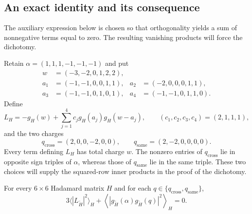 \subsection{An exact identity and its consequence}

The auxiliary expression below is chosen so that orthogonality yields a
sum of nonnegative terms equal to zero. The resulting vanishing products
will force the dichotomy.

Retain $\alpha=(1,1,1,-1,-1,-1)$ and put
\begin{align*}
  w&=(-3,-2,0,1,2,2),\\
  a_1&=(-1,-1,0,0,1,1),&
  a_2&=(-2,0,0,0,1,1),\\
  a_3&=(-1,-1,0,1,0,1),&
  a_4&=(-1,-1,0,1,1,0).
\end{align*}
Define
\begin{equation}
  L_H=-g_H(w)+\sum_{j=1}^4 c_j g_H(a_j)g_H(w-a_j),
  \qquad (c_1,c_2,c_3,c_4)=(2,1,1,1),
  \label{eq:pair-L}
\end{equation}
and the two charges
\begin{equation*}
  q_{\mathrm{cross}}=(2,0,0,-2,0,0),
  \qquad q_{\mathrm{same}}=(2,-2,0,0,0,0).
\end{equation*}
Every term defining $L_H$ has total charge $w$.
The nonzero entries of $q_{\mathrm{cross}}$ lie in opposite sign triples
of $\alpha$, whereas those of $q_{\mathrm{same}}$ lie in the same triple.
These two choices will supply the squared-row inner products in the
proof of the dichotomy.

\begin{proposition}
\label{prop:pair-certificate}
For every $6\times6$ Hadamard matrix $H$ and for each
$q\in\{q_{\mathrm{cross}},q_{\mathrm{same}}\}$,
\begin{equation}
  3\bigl\langle |L_{\widetilde H}|^2\bigr\rangle_H
  +\left\langle
       |g_{\widetilde H}(\alpha)g_{\widetilde H}(q)|^2
    \right\rangle_H=0.
  \label{eq:pair-certificate}
\end{equation}
\end{proposition}


